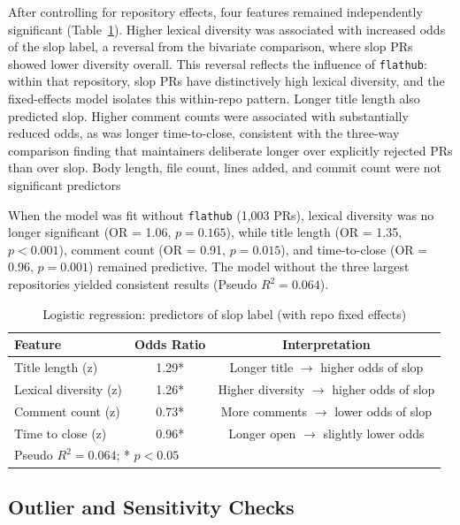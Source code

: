 \documentclass[11pt]{article}
\begin{document}
	After controlling for repository effects, four features remained independently significant (Table~\ref{tab:logistic}). Higher lexical diversity was associated with increased odds of the slop label, a reversal from the bivariate comparison, where slop PRs showed lower diversity overall. This reversal reflects the influence of \texttt{flathub}: within that repository, slop PRs have distinctively high lexical diversity, and the fixed-effects model isolates this within-repo pattern. Longer title length also predicted slop. Higher comment counts were associated with substantially reduced odds, as was longer time-to-close, consistent with the three-way comparison finding that maintainers deliberate longer over explicitly rejected PRs than over slop. Body length, file count, lines added, and commit count were not significant predictors
	
	When the model was fit without \texttt{flathub} (1,003 PRs), lexical diversity was no longer significant (OR = 1.06, $p = 0.165$), while title length (OR = 1.35, $p < 0.001$), comment count (OR = 0.91, $p = 0.015$), and time-to-close (OR = 0.96, $p = 0.001$) remained predictive. The model without the three largest repositories yielded consistent results (Pseudo $R^2 = 0.064$).
	
	\begin{table}[ht]
		\centering
		\caption{Logistic regression: predictors of slop label (with repo fixed effects)}
		\label{tab:logistic}
		\begin{tabular}{lcc}
			\toprule
			\textbf{Feature} & \textbf{Odds Ratio} & \textbf{Interpretation} \\
			\midrule
			Title length (z)      & 1.29* & Longer title $\rightarrow$ higher odds of slop \\
			Lexical diversity (z) & 1.26* & Higher diversity $\rightarrow$ higher odds of slop \\
			Comment count (z)     & 0.73* & More comments $\rightarrow$ lower odds of slop \\
			Time to close (z)     & 0.96*  & Longer open $\rightarrow$ slightly lower odds \\
			\bottomrule
			\multicolumn{3}{l}{\small Pseudo $R^2 = 0.064$; * $p < 0.05$} \\
		\end{tabular}
	\end{table}
	
	\subsection{Outlier and Sensitivity Checks}
	\label{sec:outliers}
	
\end{document}
